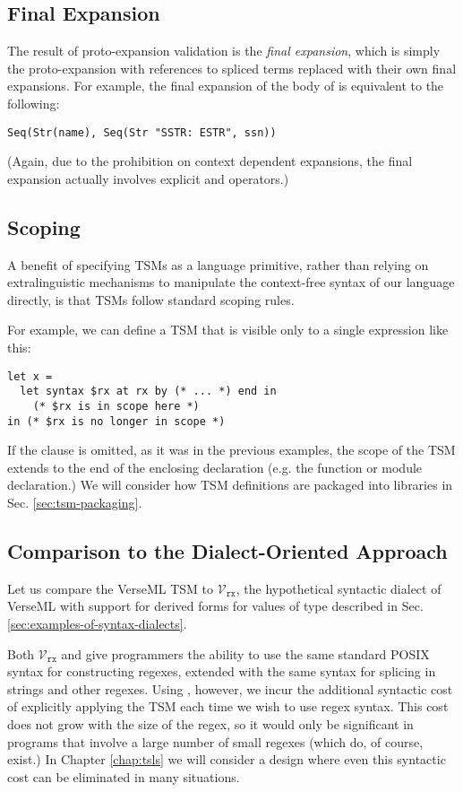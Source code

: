 \subsection{Final Expansion}
The result of proto-expansion validation is the \emph{final expansion}, which is simply the proto-expansion with  references to spliced terms replaced with their own final expansions. For example, the final expansion of the body of  is equivalent to the following:
\begin{lstlisting}[numbers=none]
Seq(Str(name), Seq(Str "SSTR: ESTR", ssn))
\end{lstlisting}
(Again, due to the prohibition on context dependent expansions, the final expansion actually involves explicit  and  operators.)

\subsection{Scoping}
A benefit of specifying TSMs as a language primitive, rather than relying on extralinguistic mechanisms to manipulate the context-free syntax of our language directly, is that TSMs follow standard scoping rules.

For example, we can define a TSM that is visible only to a single expression like this:
\begin{lstlisting}[numbers=none]
let x = 
  let syntax $rx at rx by (* ... *) end in 
    (* $rx is in scope here *) 
in (* $rx is no longer in scope *)
\end{lstlisting}

If the  clause is omitted, as it was in the previous examples, the scope of the TSM extends to the end of the enclosing declaration (e.g. the function or module declaration.)
We will consider how TSM definitions are packaged into libraries in Sec. \ref{sec:tsm-packaging}.

\subsection{Comparison to the Dialect-Oriented Approach}
Let us compare the VerseML TSM  to $\mathcal{V}_\texttt{rx}$, the hypothetical syntactic dialect of VerseML with support for derived forms for values of type  described in Sec. \ref{sec:examples-of-syntax-dialects}.

Both $\mathcal{V}_\texttt{rx}$ and  give programmers the ability to use the same standard POSIX syntax for constructing regexes, extended with the same syntax for splicing in strings and other regexes. Using , however, we incur the additional syntactic cost of explicitly applying the  TSM each time we wish to use regex syntax. This cost does not grow with the size of the regex, so it would only be significant in programs that involve a large number of small regexes (which do, of course, exist.) In Chapter \ref{chap:tsls} we will consider a design where even this syntactic cost can be eliminated in many situations.

